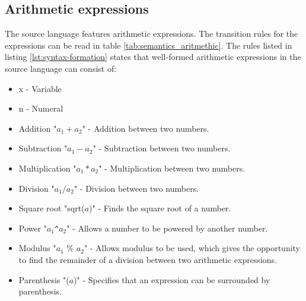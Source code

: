 \subsection{Arithmetic expressions}
The source language features arithmetic expressions. The transition rules for the expressions can be read in table \ref{tab:semantics_aritmethic}.
The rules listed in listing \ref{lst:syntax-formation} states that well-formed arithmetic expressions in the source language can consist of:
\begin{itemize}
	\item x - Variable
	\item n - Numeral
	\item Addition "$a_1 + a_2$" - Addition between two numbers.
	\item Subtraction "$a_1 - a_2$" - Subtraction between two numbers.
	\item Multiplication "$a_1 * a_2$" - Multiplication between two numbers.
	\item Division "$a_1 / a_2$" - Division between two numbers.
	\item Square root "sqrt($a$)" - Finds the square root of a number.
	\item Power "$a_1$\texttt{\^{}}$a_2$" - Allows a number to be powered by another number.
	\item Modulus "$a_1$ \% $a_2$" - Allows modulus to be used, which gives the opportunity to find the remainder of a division between two arithmetic expressions.
	\item Parenthesis "($a$)" - Specifies that an expression can be surrounded by parenthesis.
\end{itemize}

